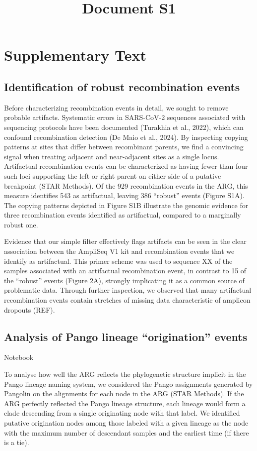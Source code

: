 \documentclass[12pt,letterpaper]{article}
\title{Document S1}
\date{}
\makeatletter
\renewcommand{\maketitle}{\bgroup\setlength{\parindent}{0pt}
\begin{flushleft}
  \textbf{\@title}
  
  \@author
\end{flushleft}\egroup}
\makeatother
\begin{document}
\maketitle

\section*{Supplementary Text}

\subsection*{Identification of robust recombination events}
Before characterizing recombination events in detail, we sought to remove probable artifacts. 
Systematic errors in SARS-CoV-2 sequences associated with sequencing protocols have been documented (Turakhia et al., 2022), 
which can confound recombination detection (De Maio et al., 2024). 
By inspecting copying patterns at sites that differ between recombinant parents, 
we find a convincing signal when treating adjacent and near-adjacent sites as a single locus. 
Artifactual recombination events can be characterized as 
having fewer than four such loci supporting the left or right parent on either side of a putative breakpoint (STAR Methods). 
Of the 929 recombination events in the ARG, this measure identifies 543 as artifactual, 
leaving 386 “robust” events (Figure S1A). 
The copying patterns depicted in Figure S1B illustrate the genomic evidence for 
three recombination events identified as artifactual, compared to a marginally robust one.

Evidence that our simple filter effectively flags artifacts can be seen in the clear association between 
the AmpliSeq V1 kit and recombination events that we identify as artifactual. 
This primer scheme was used to sequence XX of the samples associated with an artifactual recombination event, 
in contrast to 15 of the “robust” events (Figure 2A), strongly implicating it as a common source of problematic data. 
Through further inspection, we observed that many artifactual recombination events 
contain stretches of missing data characteristic of amplicon dropouts (REF).

\subsection*{Analysis of Pango lineage “origination” events}
Notebook

To analyse how well the ARG reflects the phylogenetic structure implicit in the Pango lineage naming system, 
we considered the Pango assignments generated by Pangolin on the alignments for each node in the ARG (STAR Methods). 
If the ARG perfectly reflected the Pango lineage structure, 
each lineage would form a clade descending from a single originating node with that label. 
We identified putative origination nodes among those labeled with a given lineage as the node 
with the maximum number of descendant samples and the earliest time (if there is a tie).
\end{document}
